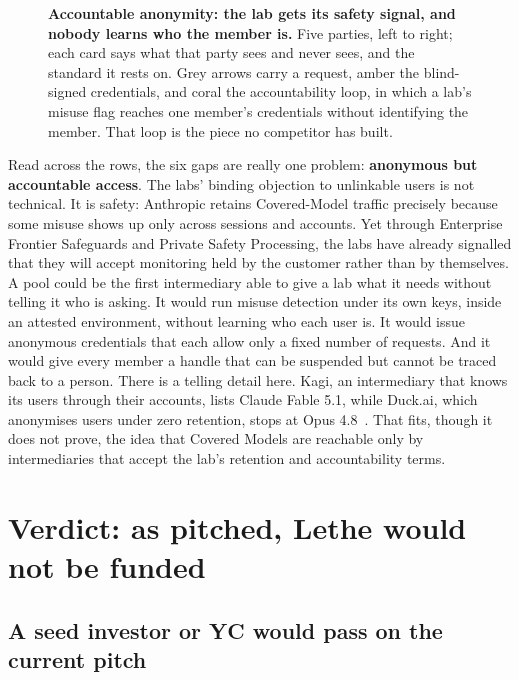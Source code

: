 \documentclass[10pt,a4paper]{article}
\begin{document}
\begin{figure}[tbp]
\centering
{}
\caption{\textbf{Accountable anonymity: the lab gets its safety signal, and nobody learns who the member is.} Five parties, left to right; each card says what that party sees and never sees, and the standard it rests on. Grey arrows carry a request, amber the blind-signed credentials, and coral the accountability loop, in which a lab's misuse flag reaches one member's credentials without identifying the member. That loop is the piece no competitor has built.}
\label{fig:accountable}
\end{figure}

Read across the rows, the six gaps are really one problem: \textbf{anonymous but accountable access}. The labs' binding objection to unlinkable users is not technical. It is safety: Anthropic retains Covered-Model traffic precisely because some misuse shows up only across sessions and accounts. Yet through Enterprise Frontier Safeguards and Private Safety Processing, the labs have already signalled that they will accept monitoring held by the customer rather than by themselves. A pool could be the first intermediary able to give a lab what it needs without telling it who is asking. It would run misuse detection under its own keys, inside an attested environment, without learning who each user is. It would issue anonymous credentials that each allow only a fixed number of requests. And it would give every member a handle that can be suspended but cannot be traced back to a person. There is a telling detail here. Kagi, an intermediary that knows its users through their accounts, lists Claude Fable 5.1, while Duck.ai, which anonymises users under zero retention, stops at Opus 4.8~\cite{kagi-docs-assistant,duckduckgo-help-duck-ai}. That fits, though it does not prove, the idea that Covered Models are reachable only by intermediaries that accept the lab's retention and accountability terms.



\FloatBarrier
\section{Verdict: as pitched, Lethe would not be funded}

\subsection{A seed investor or YC would pass on the current pitch}
\end{document}
